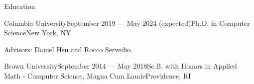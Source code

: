 \documentclass{resume} %
\begin{document}
\begin{rSection}{Education}
\begin{rSubsection}{Columbia University}{September 2019 --- May 2024 (expected)}{Ph.D. in Computer Science}{New York, NY}
\item Advisors: Daniel Hsu and Rocco Servedio.
\end{rSubsection}

\begin{rSubsection}{Brown University}{September 2014 --- May 2018}{Sc.B. with Honors in Applied Math - Computer Science, Magna Cum Laude}{Providence, RI}
\end{rSubsection}


\end{rSection}




\end{document}
